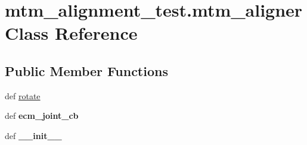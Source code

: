 \hypertarget{classmtm__alignment__test_1_1mtm__aligner}{\section{mtm\-\_\-alignment\-\_\-test.\-mtm\-\_\-aligner Class Reference}
\label{classmtm__alignment__test_1_1mtm__aligner}
}
\subsection*{Public Member Functions}
\begin{DoxyCompactItemize}
\item 
def \hyperlink{classmtm__alignment__test_1_1mtm__aligner_ae8bb0d4f0b12e149f1032b18ee13754f}{rotate}
\item 
\hypertarget{classmtm__alignment__test_1_1mtm__aligner_a356851f1dbf80bfdf88dd2be2375aadf}{def {\bfseries ecm\-\_\-joint\-\_\-cb}}\label{classmtm__alignment__test_1_1mtm__aligner_a356851f1dbf80bfdf88dd2be2375aadf}

\item 
\hypertarget{classmtm__alignment__test_1_1mtm__aligner_a86b062fc65be35830ad5239d1c453aca}{def {\bfseries \-\_\-\-\_\-init\-\_\-\-\_\-}}\label{classmtm__alignment__test_1_1mtm__aligner_a86b062fc65be35830ad5239d1c453aca}

\end{DoxyCompactItemize}
